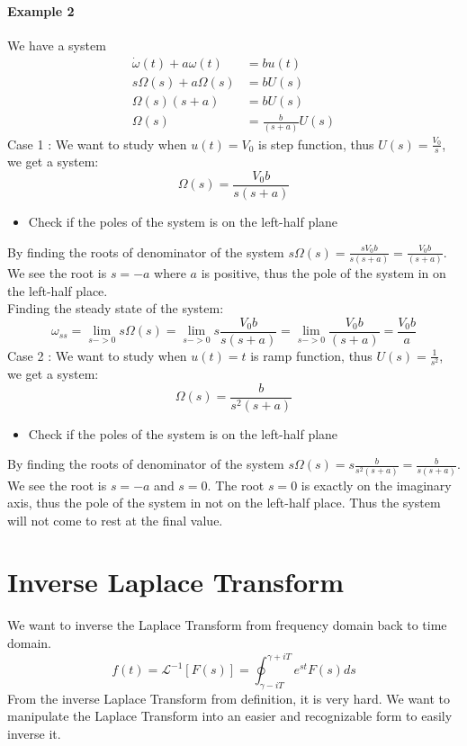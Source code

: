 \paragraph{Example 2} We have a system
\[
\begin{split}
	\dot{\omega}(t) + a \omega (t) &= b u(t) \\
	s\Omega(s) + a\Omega(s) &= b U(s) \\
	\Omega(s)(s+a) &= b U(s) \\
	\Omega(s) &= \frac{b}{(s+a)} U(s)
\end{split}
\]
Case 1 : We want to study when \(u(t)=V_0\) is step function, thus \(U(s) = \frac{V_0}{s}\), we get a system:
\[
\Omega(s) = \frac{V_0b}{s(s+a)}
\]
\begin{itemize}
	\item Check if the poles of the system is on the left-half plane
\end{itemize}
By finding the roots of denominator of the system \(s\Omega(s) = \frac{sV_0b}{s(s+a)} = \frac{V_0b}{(s+a)}\). We see the root is \(s = -a\) where \(a\) is positive, thus the pole of the system in on the left-half place. \\
Finding the steady state of the system:
\[
\omega_{ss} = \lim_{s->0} s\Omega(s) = \lim_{s->0} s\frac{V_0b}{s(s+a)} = \lim_{s->0} \frac{V_0b}{(s+a)} = \frac{V_0b}{a}
\]
Case 2 : We want to study when \(u(t)=t\) is ramp function, thus \(U(s) = \frac{1}{s^2}\), we get a system:
\[
\Omega(s) = \frac{b}{s^2(s+a)}
\]
\begin{itemize}
	\item Check if the poles of the system is on the left-half plane
\end{itemize}
By finding the roots of denominator of the system \(s\Omega(s) = s\frac{b}{s^2(s+a)} = \frac{b}{s(s+a)}\). We see the root is \(s = -a\) and \(s=0\). The root \(s=0\) is exactly on the imaginary axis, thus the pole of the system in not on the left-half place. Thus the system will not come to rest at the final value.




\section{Inverse Laplace Transform}
We want to inverse the Laplace Transform from frequency domain back to time domain.
\[
f(t) = \mathcal{L}^{-1}[F(s)] = \oint_{{\gamma-iT}}^{{\gamma+iT}} e^{st} F(s) ds
\]
From the inverse Laplace Transform from definition, it is very hard. We want to manipulate the Laplace Transform into an easier and recognizable form to easily inverse it. 

